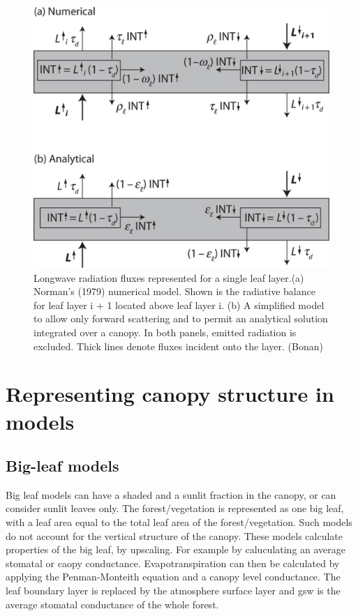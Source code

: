 \documentclass[
  12pt,
  oneside]{book}
\begin{document}
\begin{figure}

{\centering \includegraphics[width=0.8\linewidth]{figures/chap3/f322_LW} 

}

\caption{Longwave radiation fluxes represented for a single leaf layer.(a) Norman’s (1979) numerical model. Shown is the radiative balance for leaf layer i + 1 located above leaf layer i. (b) A simplified model to allow only forward scattering and to permit an analytical solution integrated over a canopy. In both panels, emitted radiation is excluded. Thick lines denote fluxes incident onto the layer. (Bonan)}\label{fig:f322}
\end{figure}

\hypertarget{representing-canopy-structure-in-models}{%
\section{Representing canopy structure in models}\label{representing-canopy-structure-in-models}}

\hypertarget{big-leaf-models}{%
\subsection{Big-leaf models}\label{big-leaf-models}}

Big leaf models can have a shaded and a sunlit fraction in the canopy, or can consider sunlit leaves only. The forest/vegetation is represented as one big leaf, with a leaf area equal to the total leaf area of the forest/vegetation. Such models do not account for the vertical structure of the canopy. These models calculate properties of the big leaf, by upscaling. For example by caluculating an average stomatal or caopy conductance. Evapotranspiration can then be calculated by applying the Penman-Monteith equation and a canopy level conductance. The leaf boundary layer is replaced by the atmosphere surface layer and gsw is the average stomatal conductance of the whole forest.
\end{document}
